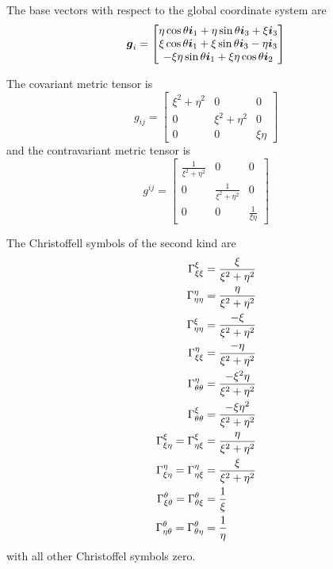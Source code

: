 The base vectors with respect to the global coordinate system are
\begin{equation}
  \boldsymbol{g}_{i}=\begin{bmatrix} 
    \eta\cos\theta\boldsymbol{i}_{1}+\eta\sin\theta\boldsymbol{i}_{3}+\xi\boldsymbol{i}_{3}\\
    \xi\cos\theta\boldsymbol{i}_{1}+\xi\sin\theta\boldsymbol{i}_{3}-\eta\boldsymbol{i}_{3}\\ 
    -\xi\eta\sin\theta\boldsymbol{i}_{1}+\xi\eta\cos\theta\boldsymbol{i}_{2}
  \end{bmatrix}
\end{equation}

The covariant metric tensor is
\begin{equation}
  g_{ij}=\begin{bmatrix}
    \xi^{2}+\eta^{2} & 0 & 0 \\
    0 & \xi^{2}+\eta^{2} & 0 \\
    0 & 0 & \xi\eta
  \end{bmatrix}
\end{equation}
and the contravariant metric tensor is
\begin{equation}
  g^{ij}=\begin{bmatrix}
    \frac{1}{\xi^{2}+\eta^{2}}& 0 & 0 \\
    0 & \frac{1}{\xi^{2}+\eta^{2}} & 0 \\
    0 & 0 & \frac{1}{\xi\eta}
  \end{bmatrix}
\end{equation}

The Christoffell symbols of the second kind are
\begin{align}
   \Gamma^{\xi}_{\xi\xi} &=\frac{\xi}{\xi^{2}+\eta^{2}} \\
   \Gamma^{\eta}_{\eta\eta} &=\frac{\eta}{\xi^{2}+\eta^{2}} \\
   \Gamma^{\xi}_{\eta\eta} &=\frac{-\xi}{\xi^{2}+\eta^{2}} \\
   \Gamma^{\eta}_{\xi\xi} &=\frac{-\eta}{\xi^{2}+\eta^{2}} \\
   \Gamma^{\eta}_{\theta\theta} &=\frac{-\xi^{2}\eta}{\xi^{2}+\eta^{2}} \\
   \Gamma^{\xi}_{\theta\theta} &=\frac{-\xi\eta^{2}}{\xi^{2}+\eta^{2}} \\
   \Gamma^{\xi}_{\xi\eta} = \Gamma^{\xi}_{\eta\xi} &=\frac{\eta}{\xi^{2}+\eta^{2}} \\
   \Gamma^{\eta}_{\xi\eta} = \Gamma^{\eta}_{\eta\xi} &=\frac{\xi}{\xi^{2}+\eta^{2}} \\
   \Gamma^{\theta}_{\xi\theta} = \Gamma^{\theta}_{\theta\xi} &=\frac{1}{\xi} \\
   \Gamma^{\theta}_{\eta\theta} = \Gamma^{\theta}_{\theta\eta} &=\frac{1}{\eta} \\
\end{align}
with all other Christoffel symbols zero.

